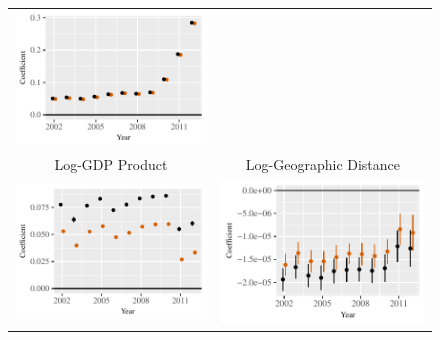 \documentclass[reqno,onecolumn,letterpaper,12pt]{article}
\begin{document}
\begin{figure}[htp]
\begin{tabular}{c@{\hskip -.4cm}c}
\includegraphics[height=.2\textheight, clip=true, trim=.5cm .5cm 0cm .1cm]{draft_figures/rl_plots/LDV.pdf}   \\
Log-GDP Product &
Log-Geographic Distance\\
\includegraphics[height=.2\textheight, clip=true, trim=0cm .5cm 0cm .1cm]{draft_figures/rl_plots/GDP_Dyad.pdf}    &
\includegraphics[height=.2\textheight, clip=true, trim=.5cm .5cm 0cm .1cm]{draft_figures/rl_plots/Distance.pdf}   \\

\end{tabular}
\end{figure}
\end{document}
